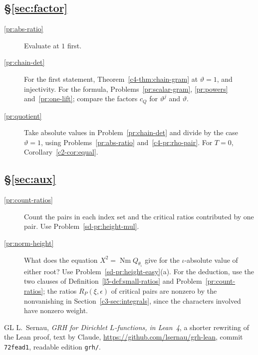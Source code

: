 \documentclass[reqno]{amsart}
\theoremstyle{definition}
\theoremstyle{plain}
\newcommand{\Nm}{\operatorname{Nm}}
\begin{document}
\subsection*{\S\ref{sec:factor}}
\begin{description}
\item[\ref{pr:abs-ratio}] Evaluate at \(1\) first.
\item[\ref{pr:chain-det}] For the first statement, Theorem~\ref{c4-thm:chain-gram} at \(\vartheta = 1\), and injectivity.  For the formula, Problems~\ref{pr:scalar-gram}, \ref{pr:powers} and~\ref{pr:one-lift}; compare the factors \(c_{Q}\) for \(\vartheta^j\) and \(\vartheta\).
\item[\ref{pr:quotient}] Take absolute values in Problem~\ref{pr:chain-det} and divide by the case \(\vartheta = 1\), using Problems~\ref{pr:abs-ratio} and~\ref{c4-pr:rho-pair}.  For \(T = 0\), Corollary~\ref{c2-cor:equal}.
\end{description}

\subsection*{\S\ref{sec:aux}}
\begin{description}
\item[\ref{pr:count-ratios}] Count the pairs in each index set and the critical ratios contributed by one pair.  Use Problem~\ref{sd-pr:height-mul}.
\item[\ref{pr:norm-height}] What does the equation \(X^2 = \Nm Q_{\theta_\iota}\) give for the \(\iota\)-absolute value of either root?  Use Problem~\ref{sd-pr:height-easy}(a).  For the deduction, use the two clauses of Definition~\ref{l5-def:small-ratios} and Problem~\ref{pr:count-ratios}; the ratios \(R_P(\xi, \epsilon)\) of critical pairs are nonzero by the nonvanishing in Section~\ref{c3-sec:integrals}, since the characters involved have nonzero weight.
\end{description}

\begin{thebibliography}{GL}
 L.~Sernau, \emph{GRH for Dirichlet \(L\)-functions, in Lean~4}, a shorter rewriting of the Lean proof, text by Claude, \url{https://github.com/lsernau/grh-lean}, commit \texttt{72fead1}, readable edition \texttt{grh/}.
\end{thebibliography}
\end{document}
